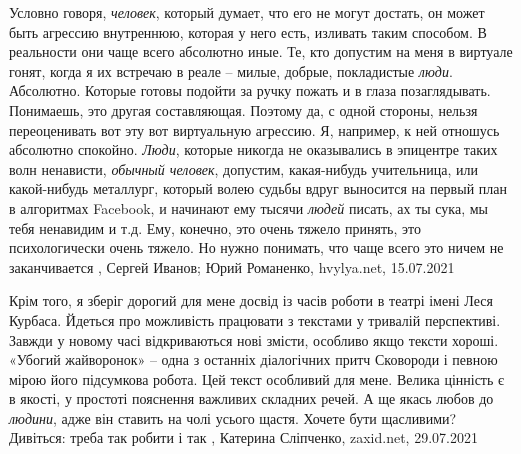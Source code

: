Условно говоря, \emph{человек}, который думает, что его не могут достать, он
может быть агрессию внутреннюю, которая у него есть, изливать таким способом. В
реальности они чаще всего абсолютно иные. Те, кто допустим на меня в виртуале
гонят, когда я их встречаю в реале – милые, добрые, покладистые \emph{люди}.
Абсолютно.  Которые готовы подойти за ручку пожать и в глаза позаглядывать.
Понимаешь, это другая составляющая. Поэтому да, с одной стороны, нельзя
переоценивать вот эту вот виртуальную агрессию. Я, например, к ней отношусь
абсолютно спокойно.  \emph{Люди}, которые никогда не оказывались в эпицентре
таких волн ненависти, \emph{обычный человек}, допустим, какая-нибудь учительница, или
какой-нибудь металлург, который волею судьбы вдруг выносится на первый план в
алгоритмах Facebook, и начинают ему тысячи \emph{людей} писать, ах ты сука, мы тебя
ненавидим и т.д. Ему, конечно, это очень тяжело принять, это психологически
очень тяжело. Но нужно понимать, что чаще всего это ничем не заканчивается
, 
Сергей Иванов; Юрий Романенко, hvylya.net, 15.07.2021

Крім того, я зберіг дорогий для мене досвід із часів роботи в театрі імені Леся
Курбаса. Йдеться про можливість працювати з текстами у тривалій перспективі.
Завжди у новому часі відкриваються нові змісти, особливо якщо тексти хороші.
«Убогий жайворонок» – одна з останніх діалогічних притч Сковороди і певною
мірою його підсумкова робота. Цей текст особливий для мене. Велика цінність є в
якості, у простоті пояснення важливих складних речей. А ще якась любов до
\emph{людини}, адже він ставить на чолі усього щастя. Хочете бути щасливими? Дивіться:
треба так робити і так
, 
Катерина Сліпченко, zaxid.net, 29.07.2021
